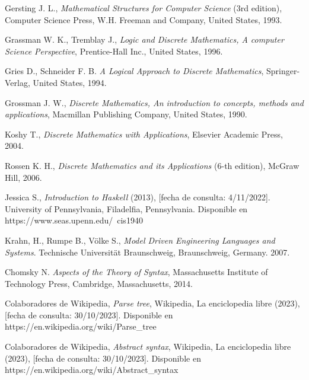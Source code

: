 \begin{thebibliography}{11}
    \bibitem{}
    \label{sec:69}
    \hypertarget{69}{}
    Gersting J. L., \textit{Mathematical Structures for Computer Science} (3rd edition), Computer Science Press, W.H. Freeman and Company, United States, 1993.

    \bibitem{}
    \label{sec:70}
    \hypertarget{70}{}
    Grassman W. K., Tremblay J., \textit{Logic and Discrete Mathematics, A computer Science Perspective}, Prentice-Hall Inc., United States, 1996.

    \bibitem{}
    \label{sec:71}
    \hypertarget{71}{}
    Gries D., Schneider F. B. \textit{A Logical Approach to Discrete Mathematics}, Springer-Verlag, United States, 1994.

    \bibitem{}
    \label{sec:72}
    \hypertarget{72}{}
    Grossman J. W., \textit{Discrete Mathematics, An introduction to concepts, methods and applications}, Macmillan Publishing Company, United States, 1990.

    \bibitem{}
    \label{sec:73}
    \hypertarget{73}{}
    Koshy T., \textit{Discrete Mathematics with Applications}, Elsevier Academic Press, 2004.

    \bibitem{}
    \label{sec:74}
    \hypertarget{74}{}
    Rossen K. H., \textit{Discrete Mathematics and its Applications} (6-th edition), McGraw Hill, 2006.

    \bibitem{}
    \label{sec:75}
    \hypertarget{75}{}
    Jessica S., \textit{Introduction to Haskell} (2013), [fecha de consulta: 4/11/2022]. University of Pennsylvania, Filadelfia, Pennsylvania. Disponible en https://www.seas.upenn.edu/~cis1940

    \bibitem{}
    \label{sec:76}
    \hypertarget{76}{}
    Krahn, H., Rumpe B., Völke S., \textit{Model Driven Engineering Languages and Systems}. Technische Universität Braunschweig, Braunschweig, Germany. 2007. %

    \bibitem{}
    \label{sec:77}
    \hypertarget{77}{}
    Chomsky N. \textit{Aspects of the Theory of Syntax}, Massachusetts Institute of Technology Press, Cambridge, Massachusetts, 2014.
    
    \bibitem{}
    \label{sec:78}
    \hypertarget{78}{}
    Colaboradores de Wikipedia, \textit{Parse tree}, Wikipedia, La enciclopedia libre (2023), [fecha de consulta: 30/10/2023]. Disponible en https://en.wikipedia.org/wiki/Parse\_tree

    \bibitem{}
    \label{sec:79}
    \hypertarget{79}{}
    Colaboradores de Wikipedia, \textit{Abstract syntax}, Wikipedia, La enciclopedia libre (2023), [fecha de consulta: 30/10/2023]. Disponible en https://en.wikipedia.org/wiki/Abstract\_syntax


\end{thebibliography}

